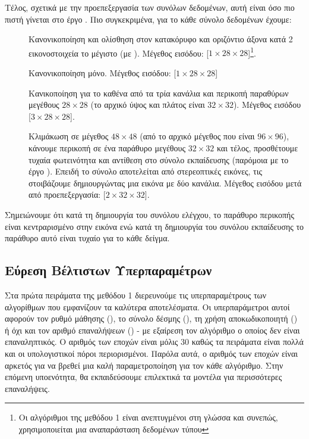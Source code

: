 Τέλος, σχετικά με την προεπεξεργασία των συνόλων δεδομένων, αυτή είναι όσο πιο πιστή γίνεται στο έργο \cite{sabour2017dynamic}. Πιο συγκεκριμένα, για το κάθε σύνολο δεδομένων έχουμε:
\begin{description}
    \item[] Κανονικοποίηση και ολίσθηση στον κατακόρυφο και οριζόντιο άξονα κατά 2 εικονοστοιχεία το μέγιστο (με ). Μέγεθος εισόδου: [$1 \times 28 \times 28$]\footnote{Οι αλγόριθμοι της μεθόδου 1 είναι ανεπτυγμένοι στη γλώσσα  και συνεπώς, χρησιμοποιείται μια αναπαράσταση δεδομένων τύπου }.
    \item[] Κανονικοποίηση μόνο. Μέγεθος εισόδου: [$1 \times 28 \times 28$]
    \item[] Κανικοποίηση για το καθένα από τα τρία κανάλια και περικοπή παραθύρων μεγέθους $28 \times 28$ (το αρχικό ύψος και πλάτος είναι $32 \times 32$). Μέγεθος εισόδου [$3 \times 28 \times 28$].
    \item[] Κλιμάκωση σε μέγεθος $48 \times 48$ (από το αρχικό μέγεθος που είναι $96 \times 96$), κάνουμε περικοπή σε ένα παράθυρο μεγέθους $32 \times 32$ και τέλος, προσθέτουμε τυχαία φωτεινότητα και αντίθεση στο σύνολο εκπαίδευσης (παρόμοια με το έργο \cite{hinton2018matrix}). Επειδή το σύνολο αποτελείται από στερεοπτικές εικόνες, τις στοιβάζουμε δημιουργώντας μια εικόνα με δύο κανάλια. Μέγεθος εισόδου μετά από προεπεξεργασία: [$2 \times 32 \times 32$].
\end{description} 
Σημειώνουμε ότι κατά τη δημιουργία του συνόλου ελέγχου, το παράθυρο περικοπής είναι κεντραρισμένο στην εικόνα ενώ κατά τη δημιουργία του συνόλου εκπαίδευσης το παράθυρο αυτό είναι τυχαίο για το κάθε δείγμα.

\subsection{Εύρεση Βέλτιστων Υπερπαραμέτρων}

Στα πρώτα πειράματα της μεθόδου 1 διερευνούμε τις υπερπαραμέτρους των αλγορίθμων που εμφανίζουν τα καλύτερα αποτελέσματα. Οι υπερπαράμετροι αυτοί αφορούν τον ρυθμό μάθησης (), το σύνολο δέσμης (), τη χρήση αποκωδικοποιητή () ή όχι και τον αριθμό επαναλήψεων () - με εξαίρεση τον αλγόριθμο  ο οποίος δεν είναι επαναληπτικός. Ο αριθμός των εποχών είναι μόλις 30 καθώς τα πειράματα είναι πολλά και οι υπολογιστικοί πόροι περιορισμένοι. Παρόλα αυτά, ο αριθμός των εποχών είναι αρκετός για να βρεθεί μια καλή παραμετροποίηση για τον κάθε αλγόριθμο. Στην επόμενη υποενότητα, θα εκπαιδεύσουμε επιλεκτικά τα μοντέλα για περισσότερες επαναλήψεις. 

